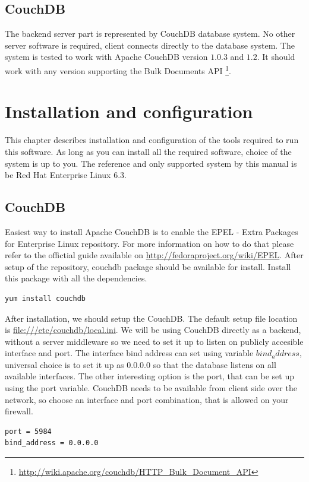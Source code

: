 \documentclass[10pt,a4paper,oneside]{report}
\begin{document}
\section{CouchDB}
The backend server part is represented by CouchDB database system. No other
server software is required, client connects directly to the database system.
The system is tested to work with Apache CouchDB version $1.0.3$ and $1.2$. It
should work with any version supporting the Bulk Documents API
\footnote{\url{http://wiki.apache.org/couchdb/HTTP_Bulk_Document_API}}.





\chapter{Installation and configuration}
This chapter describes installation and configuration of the tools required to
run this software. As long as you can install all the required software,
choice of the system is up to you. The reference and only supported system by
this manual is be Red Hat Enterprise Linux 6.3.

\section{CouchDB}
Easiest way to install Apache CouchDB is to enable the EPEL - Extra Packages for
Enterprise Linux repository. For more information on how to do that please refer
to the offictial guide available on \url{http://fedoraproject.org/wiki/EPEL}.
After setup of the repository, couchdb package should be available for install.
Install this package with all the dependencies.
\begin{verbatim}
yum install couchdb
\end{verbatim}
After installation, we should setup the CouchDB. The default setup file location
is \url{file:///etc/couchdb/local.ini}. We will be using CouchDB directly as a
backend, without a server middleware so we need to set it up to listen on
publicly accesible interface and port. The interface bind address can set using
variable $bind_address$, universal choice is to set it up as $0.0.0.0$ so that
the database listens on all available interfaces. The other interesting option is
the port, that can be set up using the port variable. CouchDB needs to be
available from client side over the network, so choose an interface and port combination, that is allowed on your firewall.

\begin{verbatim}
port = 5984
bind_address = 0.0.0.0
\end{verbatim}
\end{document}
